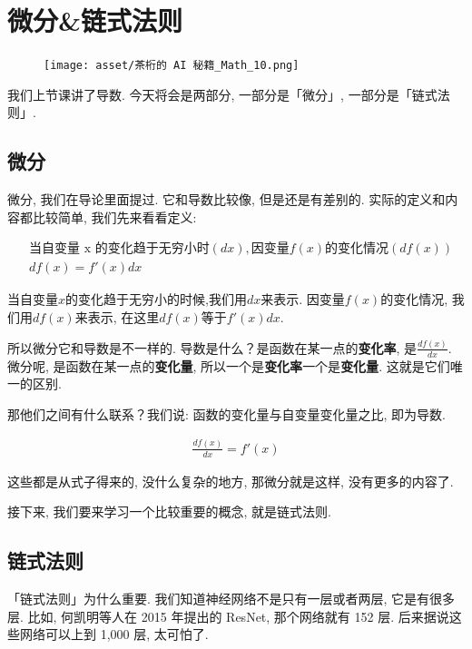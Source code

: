 \chapter{微分\&链式法则}

\begin{figure}[ht]
  \centering
  \texttt{[image: asset/茶桁的 AI 秘籍\_Math\_10.png]}
\end{figure}

\newpage

我们上节课讲了导数. 今天将会是两部分, 一部分是「微分」, 一部分是「链式法则」. 

\section{微分}

微分, 我们在导论里面提过. 它和导数比较像, 但是还是有差别的. 实际的定义和内容都比较简单, 我们先来看看定义:

\begin{align*}
  & \mbox{当自变量 x 的变化趋于无穷小时}(dx), \mbox{因变量}f(x)\mbox{的变化情况}(df(x)) \\
  & df(x) = f'(x)dx
\end{align*}

当自变量$x$的变化趋于无穷小的时候,我们用$dx$来表示. 因变量$f(x)$的变化情况, 我们用$df(x)$来表示, 在这里$df(x)$等于$f'(x)dx$. 

所以微分它和导数是不一样的. 导数是什么？是函数在某一点的\textbf{变化率}, 是$\frac{df(x)}{dx}$. 微分呢, 是函数在某一点的\textbf{变化量}, 所以一个是\textbf{变化率}一个是\textbf{变化量}. 这就是它们唯一的区别. 

那他们之间有什么联系？我们说: 函数的变化量与自变量变化量之比, 即为导数. 

\begin{align*}
  \frac{df(x)}{dx} = f'(x)
\end{align*}

这些都是从式子得来的, 没什么复杂的地方, 那微分就是这样, 没有更多的内容了. 

接下来, 我们要来学习一个比较重要的概念, 就是链式法则. 

\section{链式法则}

「链式法则」为什么重要. 我们知道神经网络不是只有一层或者两层, 它是有很多层. 比如, 何凯明等人在 2015 年提出的 ResNet, 那个网络就有 152 层. 后来据说这些网络可以上到 1,000 层, 太可怕了. 

